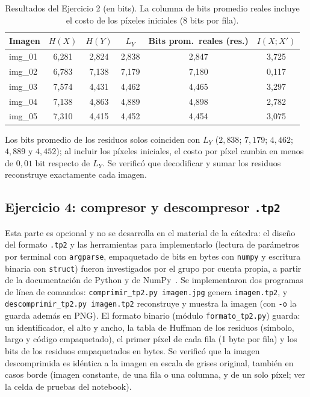 \documentclass[11pt,a4paper]{article}
\begin{document}
\begin{table}[H]
\centering
\begin{tabular}{lccccc}
\toprule
Imagen & $H(X)$ & $H(Y)$ & $L_Y$ & Bits prom.\ reales (res.) & $I(X;X')$ \\
\midrule
img\_01 & 6,281 & 2,824 & 2,838 & 2,847 & 3,725 \\
img\_02 & 6,783 & 7,138 & 7,179 & 7,180 & 0,117 \\
img\_03 & 7,574 & 4,431 & 4,462 & 4,465 & 3,297 \\
img\_04 & 7,138 & 4,863 & 4,889 & 4,898 & 2,782 \\
img\_05 & 7,310 & 4,415 & 4,452 & 4,454 & 3,075 \\
\bottomrule
\end{tabular}
\caption{Resultados del Ejercicio 2 (en bits). La columna de bits promedio reales incluye el costo de los píxeles iniciales (8 bits por fila).}
\end{table}

Los bits promedio de los residuos solos coinciden con $L_Y$ ($2{,}838$; $7{,}179$; $4{,}462$; $4{,}889$ y $4{,}452$); al incluir los píxeles iniciales, el costo por píxel cambia en menos de $0{,}01$ bit respecto de $L_Y$.
Se verificó que decodificar y sumar los residuos reconstruye exactamente cada imagen.

\subsection{Ejercicio 4: compresor y descompresor \texttt{.tp2}}
Esta parte es opcional y no se desarrolla en el material de la cátedra: el diseño del formato \texttt{.tp2} y las herramientas para implementarlo 
(lectura de parámetros por terminal con \texttt{argparse}, empaquetado de bits en bytes con \texttt{numpy} y escritura binaria con \texttt{struct}) fueron investigados por el grupo por cuenta propia, a partir de la documentación de Python y de NumPy~\cite{pydocs}. 
Se implementaron dos programas de línea de comandos: \texttt{comprimir\_tp2.py imagen.jpg} genera \texttt{imagen.tp2}, y \texttt{descomprimir\_tp2.py imagen.tp2} reconstruye y muestra la imagen (con \texttt{-o} la guarda además en PNG). 
El formato binario (módulo \texttt{formato\_tp2.py}) guarda: un identificador, el alto y ancho, la tabla de Huffman de los residuos (símbolo, largo y código empaquetado), el primer píxel de cada fila (1 byte por fila) y 
los bits de los residuos empaquetados en bytes. Se verificó que la imagen descomprimida es idéntica a la imagen en escala de grises original, también en casos borde (imagen constante, de una fila o una columna, y de un solo píxel; ver la celda de pruebas del notebook).
\end{document}
